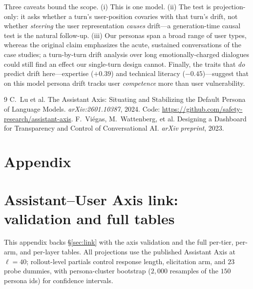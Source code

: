 \documentclass{article}
\begin{document}
Three caveats bound the scope. (i) This is one model. (ii) The test is projection-only: it asks whether a turn's user-position covaries with that turn's drift, not whether \emph{steering} the user representation \emph{causes} drift---a generation-time causal test is the natural follow-up. (iii) Our personas span a broad range of user types, whereas the original claim emphasizes the acute, sustained conversations of the case studies; a turn-by-turn drift analysis over long emotionally-charged dialogues could still find an effect our single-turn design cannot. Finally, the traits that \emph{do} predict drift here---expertise ($+0.39$) and technical literacy ($-0.45$)---suggest that on this model persona drift tracks user \emph{competence} more than user vulnerability.



\begin{thebibliography}{9}
\providecommand{\natexlab}[1]{#1}
C.~Lu et al.
\newblock The Assistant Axis: Situating and Stabilizing the Default Persona of Language Models.
\newblock \emph{arXiv:2601.10387}, 2024.
\newblock Code: \url{https://github.com/safety-research/assistant-axis}.
F.~Vi\'egas, M.~Wattenberg, et al.
\newblock Designing a Dashboard for Transparency and Control of Conversational AI.
\newblock \emph{arXiv preprint}, 2023.
\end{thebibliography}

\appendix
\newpage
\section*{\centering Appendix}

\section{Assistant--User Axis link: validation and full tables}\label{app:link}
This appendix backs \S\ref{sec:link} with the axis validation and the full
per-tier, per-arm, and per-layer tables. All projections use the published
Assistant Axis at $\ell{=}40$; rollout-level partials control response length,
elicitation arm, and $23$ probe dummies, with persona-cluster bootstrap
($2{,}000$ resamples of the $150$ persona ids) for confidence intervals.
\end{document}
